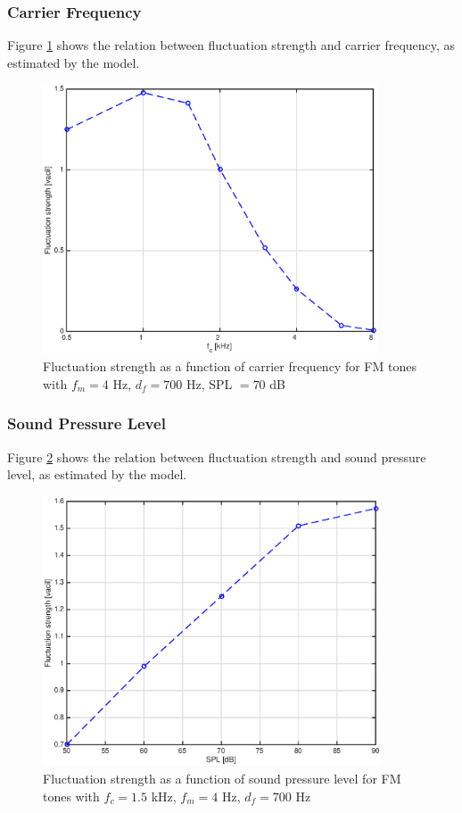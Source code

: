 \documentclass[a4paper]{article}
\begin{document}
\subsubsection{Carrier Frequency}

Figure \ref{fig:FMtonesfcplot} shows the relation between fluctuation strength
and carrier frequency, as estimated by the model.

\begin{figure}[ht]
    \centering
    \includegraphics[height=8cm]{img/fm_tones_fc_plot}
    \caption{Fluctuation strength as a function of carrier frequency for FM
        tones with $f_m = 4$ Hz, $d_f = 700$ Hz, SPL $= 70$ dB}
    \label{fig:FMtonesfcplot}
\end{figure}

\subsubsection{Sound Pressure Level}

Figure \ref{fig:FMtonesSPLplot} shows the relation between fluctuation strength
and sound pressure level, as estimated by the model.

\begin{figure}[ht]
    \centering
    \includegraphics[height=8cm]{img/fm_tones_SPL_plot}
    \caption{Fluctuation strength as a function of sound pressure level for FM
        tones with $f_c = 1.5$ kHz, $f_m = 4$ Hz, $d_f = 700$ Hz}
    \label{fig:FMtonesSPLplot}
\end{figure}
\end{document}
